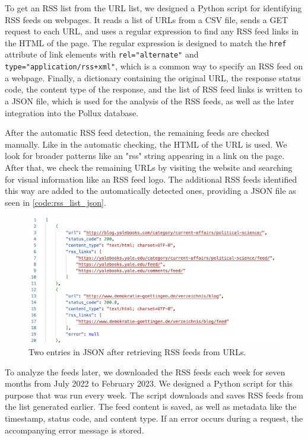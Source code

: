 \documentclass{article}
\begin{document}
To get an RSS list from the URL list, we designed a Python script for identifying RSS feeds on webpages. It reads a list of URLs from a CSV file, sends a GET request to each URL, and uses a regular expression to find any RSS feed links in the HTML of the page. The regular expression is designed to match the \texttt{href} attribute of link elements with \texttt{rel="alternate"} and \texttt{type="application/rss+xml"}, which is a common way to specify an RSS feed on a webpage. Finally, a dictionary containing the original URL, the response status code, the content type of the response, and the list of RSS feed links is written to a JSON file, which is used for the analysis of the RSS feeds, as well as the later integration into the Pollux database.

After the automatic RSS feed detection, the remaining feeds are checked manually. Like in the automatic checking, the HTML of the URL is used. We look for broader patterns like an "rss" string appearing in a link on the page. After that, we check the remaining URLs by visiting the website and searching for visual information like an RSS feed logo. The additional RSS feeds identified this way are added to the automatically detected ones, providing a JSON file as seen in \autoref{code:rss_list_json}.
\begin{figure}[htb]
    \includegraphics[width=.7\textwidth]{figures/rss_list_json.png}
    \caption{Two entries in JSON after retrieving RSS feeds from URLs.}
    \label{code:rss_list_json}
\end{figure}

To analyze the feeds later, we downloaded the RSS feeds each week for seven months from July 2022 to February 2023. We designed a Python script for this purpose that was run every week. The script downloads and saves RSS feeds from the list generated earlier. The feed content is saved, as well as metadata like the timestamp, status code, and content type. If an error occurs during a request, the accompanying error message is stored.
\end{document}
